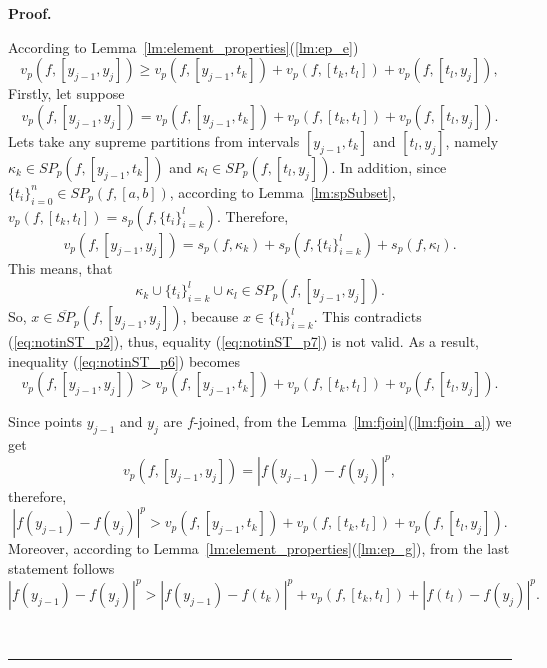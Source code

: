\documentclass[12pt, a4paper]{article}
\newenvironment{proof}[1][Proof]{\noindent \textbf{#1.} }{\  \rule{0.5em}{0.5em}}
\numberwithin{equation}{section}
\begin{document}
\begin{proof}
 
  According to Lemma~\ref{lm:element_properties}(\ref{lm:ep_e})
  \begin{equation}\label{eq:notinST_p6}
    v_p(f,[y_{j-1},y_j]) \geq v_p(f,[y_{j-1},t_{k}]) 
      + v_p(f,[t_{k},t_{l}]) + v_p(f,[t_{l},y_j]),
  \end{equation}      
  Firstly, let suppose   
  \begin{equation}\label{eq:notinST_p7}
    v_p(f,[y_{j-1},y_j]) = v_p(f,[y_{j-1},t_{k}]) 
      + v_p(f,[t_{k},t_{l}]) + v_p(f,[t_{l},y_j]).
  \end{equation}   
  Lets take any supreme partitions from intervals
  $[y_{j-1},t_{k}]$ and  $[t_{l},y_j]$, namely
  $\kappa_k \in SP_p(f,[y_{j-1},t_{k}])$ and
  $\kappa_l \in SP_p(f,[t_{l},y_j])$.  
  In addition, since $\{t_i\}_{i=0}^n \in SP_p(f, [a, b])$,
  according to Lemma~\ref{lm:spSubset},
  $v_p(f,[t_{k},t_{l}]) = s_p(f,\{t_i\}_{i=k}^l)$.
  Therefore,
  \begin{equation*}\label{eq:notinST_p8}
    v_p(f,[y_{j-1},y_j]) = s_p(f,\kappa_k) 
      + s_p(f,\{t_i\}_{i=k}^l) + s_p(f,\kappa_l).
  \end{equation*}  
  This means, that 
  \begin{equation*}\label{eq:notinST_p9}
    \kappa_k \cup \{t_i\}_{i=k}^l \cup \kappa_l 
      \in SP_p(f, [y_{j-1}, y_j]).
  \end{equation*} 
  So, 
  $x \in \overline{SP}_p(f, [y_{j-1}, y_j])$, 
  because $x \in \{t_i\}_{i=k}^l$.
  This contradicts (\ref{eq:notinST_p2}),
  thus, equality (\ref{eq:notinST_p7}) is not valid.
  As a result, inequality (\ref{eq:notinST_p6}) becomes
  \begin{equation}\label{eq:notinST_p10}
    v_p(f,[y_{j-1},y_j]) > v_p(f,[y_{j-1},t_{k}]) 
      + v_p(f,[t_{k},t_{l}]) + v_p(f,[t_{l},y_j]).
  \end{equation}    
  
  Since points $y_{j-1}$ and $y_j$ are $f$-joined,
  from the Lemma~\ref{lm:fjoin}(\ref{lm:fjoin_a}) we get
  \begin{equation*}\label{eq:notinST_p11}
    v_p(f,[y_{j-1},y_j]) = |f(y_{j-1})-f(y_j)|^p,
  \end{equation*}   
  therefore,
  \begin{equation*}\label{eq:notinST_p12}
    |f(y_{j-1})-f(y_j)|^p > v_p(f,[y_{j-1},t_{k}]) 
      + v_p(f,[t_{k},t_{l}]) + v_p(f,[t_{l},y_j]). 
  \end{equation*}        
  Moreover, according to 
  Lemma~\ref{lm:element_properties}(\ref{lm:ep_g}), 
  from the last statement follows
  \begin{equation} \label{eq:notinST_p13}
    |f(y_{j-1})-f(y_j)|^p > |f(y_{j-1})-f(t_{k})|^p +
       v_p(f,[t_k,t_l]) +  |f(t_{l})-f(y_j)|^p.   
  \end{equation}  
  

\end{proof}
\end{document}
